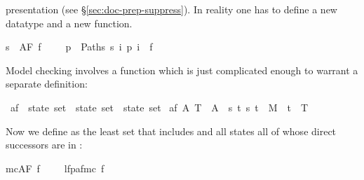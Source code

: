 \begin{isabellebody}
\begin{isamarkuptext}
{presentation (see \S\ref{sec:doc-prep-suppress}). In reality one has to define
a new datatype and a new function.}%
\end{isamarkuptext}%
\isamarkuptrue%
{}s\ {}\ AF\ f\ \ \ \ {}\ {}{}p\ {}\ Paths\ s{}\ {}i{}\ p\ i\ {}\ f{}{}%
\begin{isamarkuptext}%
\noindent
Model checking  involves a function which
is just complicated enough to warrant a separate definition:%
\end{isamarkuptext}%
\isamarkuptrue%
\isamarkupfalse%
\ af\ {}{}\ {}state\ set\ {}\ state\ set\ {}\ state\ set{}\ \isanewline
{}af\ A\ T\ {}\ A\ {}\ {}s{}\ {}t{}\ {}s{}\ t{}\ {}\ M\ {}\ t\ {}\ T{}{}%
\begin{isamarkuptext}%
\noindent
Now we define  as the least set  that includes
 and all states all of whose direct successors are in :%
\end{isamarkuptext}%
\isamarkuptrue%
{}mc{}AF\ f{}\ \ \ \ {}\ lfp{}af{}mc\ f{}{}{}%

\end{isabellebody}
